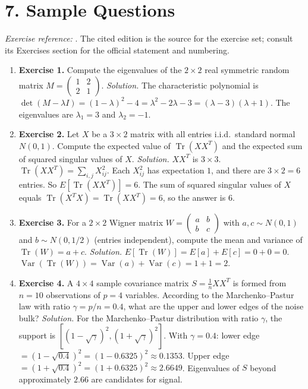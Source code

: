 \section*{7. Sample Questions}
\emph{Exercise reference:} \cite{random_matrix_theory_ref1}. The cited edition is the source for the exercise set; consult its Exercises section for the official statement and numbering.
\begin{enumerate}[leftmargin=*,itemsep=0.9em]
\item \textbf{Exercise 1.} Compute the eigenvalues of the $2\times 2$ real symmetric random matrix $M=\begin{pmatrix}1&2\\2&1\end{pmatrix}$. \emph{Solution.} The characteristic polynomial is $\det(M-\lambda I)=(1-\lambda)^2-4=\lambda^2-2\lambda-3=(\lambda-3)(\lambda+1)$. The eigenvalues are $\lambda_1=3$ and $\lambda_2=-1$.

\item \textbf{Exercise 2.} Let $X$ be a $3\times 2$ matrix with all entries i.i.d.\ standard normal $N(0,1)$. Compute the expected value of $\operatorname{Tr}(XX^T)$ and the expected sum of squared singular values of $X$. \emph{Solution.} $XX^T$ is $3\times 3$. $\operatorname{Tr}(XX^T)=\sum_{i,j}X_{ij}^2$. Each $X_{ij}^2$ has expectation $1$, and there are $3\times 2=6$ entries. So $E[\operatorname{Tr}(XX^T)]=6$. The sum of squared singular values of $X$ equals $\operatorname{Tr}(X^TX)=\operatorname{Tr}(XX^T)=6$, so the answer is $6$.

\item \textbf{Exercise 3.} For a $2\times 2$ Wigner matrix $W=\begin{pmatrix}a&b\\b&c\end{pmatrix}$ with $a,c\sim N(0,1)$ and $b\sim N(0,1/2)$ (entries independent), compute the mean and variance of $\operatorname{Tr}(W)=a+c$. \emph{Solution.} $E[\operatorname{Tr}(W)]=E[a]+E[c]=0+0=0$. $\operatorname{Var}(\operatorname{Tr}(W))=\operatorname{Var}(a)+\operatorname{Var}(c)=1+1=2$.

\item \textbf{Exercise 4.} A $4\times 4$ sample covariance matrix $S=\frac{1}{n}XX^T$ is formed from $n=10$ observations of $p=4$ variables. According to the Marchenko--Pastur law with ratio $\gamma=p/n=0.4$, what are the upper and lower edges of the noise bulk? \emph{Solution.} For the Marchenko--Pastur distribution with ratio $\gamma$, the support is $[(1-\sqrt{\gamma})^2,(1+\sqrt{\gamma})^2]$. With $\gamma=0.4$: lower edge $=(1-\sqrt{0.4})^2=(1-0.6325)^2\approx 0.1353$. Upper edge $=(1+\sqrt{0.4})^2=(1+0.6325)^2\approx 2.6649$. Eigenvalues of $S$ beyond approximately $2.66$ are candidates for signal.


\end{enumerate}
